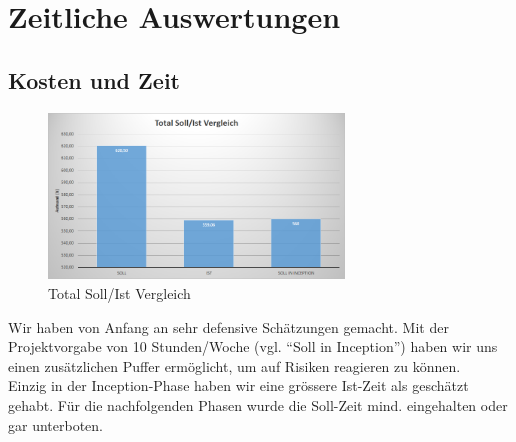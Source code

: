 \chapter{Zeitliche Auswertungen}
	\section{Kosten und Zeit}	
        \begin{figure}
            \vspace{-25pt}
            \begin{center}
                \includegraphics[width=0.7\textwidth]{content/schlussbericht/images/zeit_total_schaetzung.png}
            \end{center}
            \vspace{-25pt}
            \caption{Total Soll/Ist Vergleich}
        \end{figure}
        Wir haben von Anfang an sehr defensive Schätzungen gemacht. Mit der Projektvorgabe von 10 Stunden/Woche (vgl. \enquote{Soll in Inception}) haben wir uns einen zusätzlichen Puffer ermöglicht, um auf Risiken reagieren zu können.
        \\ Einzig in der Inception-Phase haben wir eine grössere Ist-Zeit als geschätzt gehabt. Für die nachfolgenden Phasen wurde die Soll-Zeit mind. eingehalten oder gar unterboten. 

